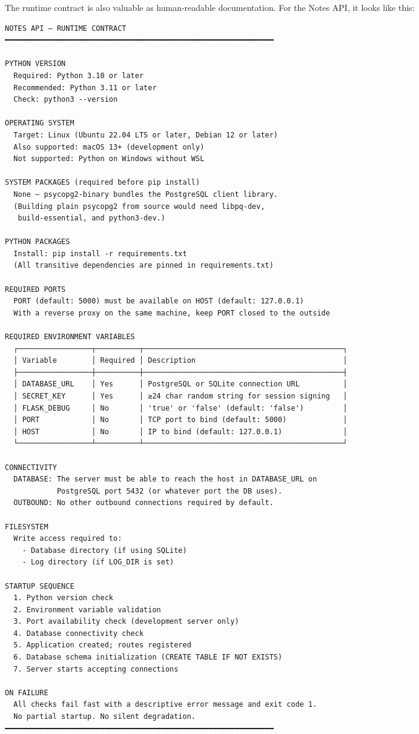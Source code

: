 The runtime contract is also valuable as human-readable documentation. For the Notes API, it looks like this:

\begin{diagrambox}{377.0pt}
\begin{Verbatim}[fontsize=\fontsize{9.0}{8.55}\selectfont]
NOTES API — RUNTIME CONTRACT
━━━━━━━━━━━━━━━━━━━━━━━━━━━━━━━━━━━━━━━━━━━━━━━━━━━━━━━━━━━━━━

PYTHON VERSION
  Required: Python 3.10 or later
  Recommended: Python 3.11 or later
  Check: python3 --version

OPERATING SYSTEM
  Target: Linux (Ubuntu 22.04 LTS or later, Debian 12 or later)
  Also supported: macOS 13+ (development only)
  Not supported: Python on Windows without WSL

SYSTEM PACKAGES (required before pip install)
  None — psycopg2-binary bundles the PostgreSQL client library.
  (Building plain psycopg2 from source would need libpq-dev,
   build-essential, and python3-dev.)

PYTHON PACKAGES
  Install: pip install -r requirements.txt
  (All transitive dependencies are pinned in requirements.txt)

REQUIRED PORTS
  PORT (default: 5000) must be available on HOST (default: 127.0.0.1)
  With a reverse proxy on the same machine, keep PORT closed to the outside

REQUIRED ENVIRONMENT VARIABLES
  ┌─────────────────┬──────────┬──────────────────────────────────────────────┐
  │ Variable        │ Required │ Description                                  │
  ├─────────────────┼──────────┼──────────────────────────────────────────────┤
  │ DATABASE_URL    │ Yes      │ PostgreSQL or SQLite connection URL          │
  │ SECRET_KEY      │ Yes      │ ≥24 char random string for session signing   │
  │ FLASK_DEBUG     │ No       │ 'true' or 'false' (default: 'false')         │
  │ PORT            │ No       │ TCP port to bind (default: 5000)             │
  │ HOST            │ No       │ IP to bind (default: 127.0.0.1)              │
  └─────────────────┴──────────┴──────────────────────────────────────────────┘

CONNECTIVITY
  DATABASE: The server must be able to reach the host in DATABASE_URL on
            PostgreSQL port 5432 (or whatever port the DB uses).
  OUTBOUND: No other outbound connections required by default.

FILESYSTEM
  Write access required to:
    - Database directory (if using SQLite)
    - Log directory (if LOG_DIR is set)

STARTUP SEQUENCE
  1. Python version check
  2. Environment variable validation
  3. Port availability check (development server only)
  4. Database connectivity check
  5. Application created; routes registered
  6. Database schema initialization (CREATE TABLE IF NOT EXISTS)
  7. Server starts accepting connections

ON FAILURE
  All checks fail fast with a descriptive error message and exit code 1.
  No partial startup. No silent degradation.
━━━━━━━━━━━━━━━━━━━━━━━━━━━━━━━━━━━━━━━━━━━━━━━━━━━━━━━━━━━━━━
\end{Verbatim}
\end{diagrambox}

